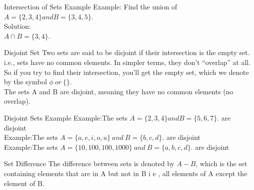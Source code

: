 \documentclass{beamer}
\begin{document}
\begin{frame}{Intersection of Sets Example}
    Example: Find the union of $A = \{2, 3, 4\} and B = \{3, 4, 5\}$.\\
Solution:\\
\centering
$A \cap B = \{3, 4\}.$
\end{frame}


\begin{frame}{Disjoint Set}
Two sets are said to be disjoint if their intersection is the empty set. i.e., sets have no common elements. In simpler terms, they don’t “overlap” at all.
So if you try to find their intersection, you’ll get the empty set, which we denote by the symbol $ \phi\ or\ \{\}$.\\
The sets A and B are disjoint, meaning they have no common elements (no overlap).
 \begin{center}
        
    \setlength{\fboxsep}{8pt}
\end{center}
    
\end{frame}
\begin{frame}{Disjoint Sets Example}
    Example:The sets  $A = \{2, 3, 4\} and B = \{5, 6, 7\}$. are disjoint\\
\vspace{2em}
     Example:The sets  $A = \{a,e, i, o,u\}\ and\ B = \{b,c,d\}$. are disjoint\\
     \vspace{2em}
     Example:The sets  $A = \{10,100,100,1000\}\ and\ B = \{a,b,c,d\}$. are disjoint\\
\end{frame}

\begin{frame}{Set Difference }
    The difference between sets is denoted by $A - B$, which is the set containing elements that are in A but not in B i e , all elements of A except the element of B.\\
\begin{center}
    \setlength{\fboxsep}{5pt}
\end{center}
    
\end{frame}
\end{document}
